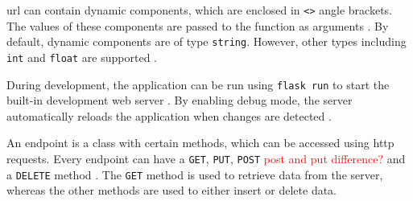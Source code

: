 \acs{url} can contain dynamic components, which are enclosed in \texttt{<>} angle brackets.
The values of these components are passed to the function as arguments \cite{flask_book2018}.
By default, dynamic components are of type \texttt{string}.
However, other types including \texttt{int} and \texttt{float} are supported \cite{flask_book2018}.

During development, the \flask{} application can be run using \texttt{flask run} to start the built-in development web server \cite{flask_book2018}.
By enabling debug mode, the server automatically reloads the application when changes are detected \cite{flask_book2018}.

An endpoint is a class with certain methods, which can be accessed using \ac{http} requests.
Every endpoint can have a \texttt{GET}, \texttt{PUT}, \texttt{POST} \textcolor{red}{post and put difference?} and a \texttt{DELETE} method \cite{flask2018}.
The \texttt{GET} method is used to retrieve data from the server, whereas the other methods are used to either insert or delete data.
